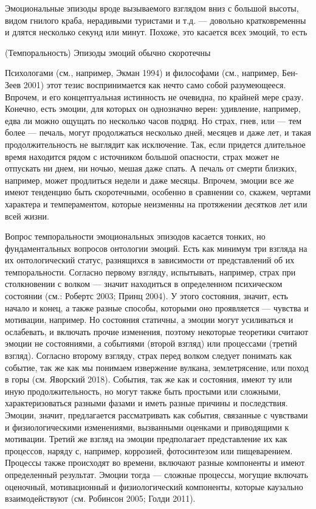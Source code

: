 \documentclass[11pt]{book}
\begin{document}
Эмоциональные эпизоды вроде вызываемого взглядом вниз с большой высоты, видом гнилого краба, нерадивыми туристами и т.д. --- довольно кратковременны и длятся несколько секунд или минут. Похоже, это касается всех эмоций, то есть

\smallskip

(Темпоральность) Эпизоды эмоций обычно скоротечны

\smallskip

Психологами (см., например, Экман 1994) и философами (см., например, Бен-Зеев 2001) этот тезис воспринимается как нечто само собой разумеющееся. Впрочем, и его концептуальная истинность не очевидна, по крайней мере сразу. Конечно, есть эмоции, для которых он однозначно верен: удивление, например, едва ли можно ощущать по несколько часов подряд. Но страх, гнев, или --- тем более --- печаль, могут продолжаться несколько дней, месяцев и даже лет, и такая продолжительность не выглядит как исключение. Так, если придется длительное время находится рядом с источником большой опасности, страх может не отпускать ни днем, ни ночью, мешая даже спать. А печаль от смерти близких, например, может продлиться недели и даже месяцы. Впрочем, эмоции все же имеют тенденцию быть скоротечными, особенно в сравнении со, скажем, чертами характера и темпераментом, которые неизменны на протяжении десятков лет или всей жизни.

Вопрос темпоральности эмоциональных эпизодов касается тонких, но фундаментальных вопросов онтологии эмоций. Есть как минимум три взгляда на их онтологический статус, разнящихся в зависимости от представлений об их темпоральности. Согласно первому взгляду, испытывать, например, страх при столкновении с волком --- значит находиться в определенном психическом состоянии (см.: Робертс 2003; Принц 2004). У этого состояния, значит, есть начало и конец, а также разные способы, которыми оно проявляется --- чувства и мотивации, например. Но состояния статичны, а эмоции могут усиливаться и ослабевать, и включать прочие изменения, поэтому некоторые теоретики считают эмоции не состояниями, а событиями (второй взгляд) или процессами (третий взгляд). Согласно второму взгляду, страх перед волком следует понимать как событие, так же как мы понимаем извержение вулкана, землетрясение, или поход в горы (см. Яворский 2018). События, так же как и состояния, имеют ту или иную продолжительность, но могут также быть простыми или сложными, характеризоваться разными фазами и иметь разные причины и последствия. Эмоции, значит, предлагается рассматривать как события, связанные с чувствами и физиологическими изменениями, вызванными оценками и приводящими к мотивации. Третий же взгляд на эмоции предполагает представление их как процессов, наряду с, например, коррозией, фотосинтезом или пищеварением. Процессы также происходят во времени, включают разные компоненты и имеют определенный результат. Эмоции тогда --- сложные процессы, могущие включать оценочный, мотивационный и физиологический компоненты, которые каузально взаимодействуют (см. Робинсон 2005; Голди 2011).
\end{document}
